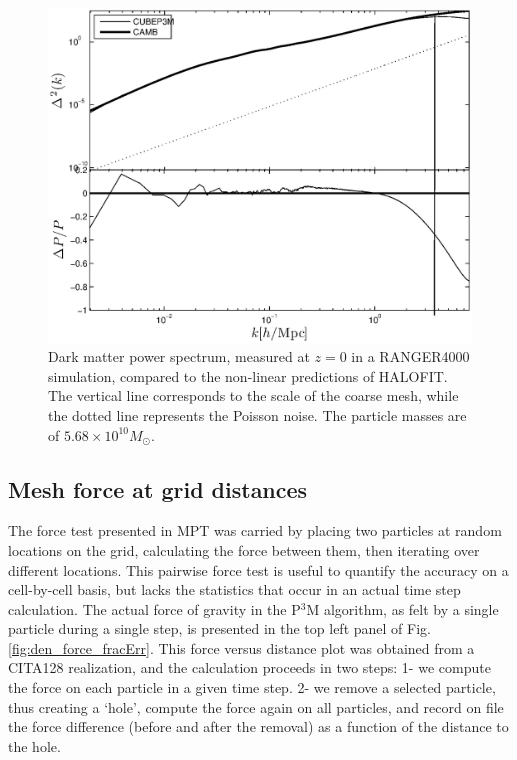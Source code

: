 \documentclass[useAMS,usenatbib]{mn2e}
\begin{document}
\begin{figure}%
  \begin{center}
    \includegraphics[width=5.2in]{graphs/power_highres.eps}
  \caption{Dark matter power spectrum, measured at $z=0$ in a RANGER4000 simulation,
  compared to the non-linear predictions of {\small HALOFIT}. 
  The vertical line corresponds to the scale of the coarse mesh, while the dotted line represents the Poisson noise.
  The particle masses are of $5.68 \times 10^{10} M_{\odot}$. 
    \label{fig:power_highres}}
\end{center}
\end{figure}

\subsection{Mesh force at grid distances}
\label{subsec:force}

The force test presented in MPT was carried by placing two particles at random locations on the grid, calculating the force between them, then iterating
over different locations. This pairwise force test is useful to quantify the accuracy on a cell-by-cell basis, but lacks the statistics that occur in an actual time step calculation.  
The actual force of gravity in the P$^3$M algorithm,
as felt by a single particle during a single step, is presented in the top left panel of Fig. \ref{fig:den_force_fracErr}.
This force versus distance plot was obtained from a CITA128 realization, and the calculation proceeds in two steps: 
1- we compute the force on each particle in a given time step.
2- we remove a selected particle, thus creating a `hole', compute the force again on all particles, and record on file the 
force difference (before  and after the removal) as a function of the distance to the hole.
\end{document}
